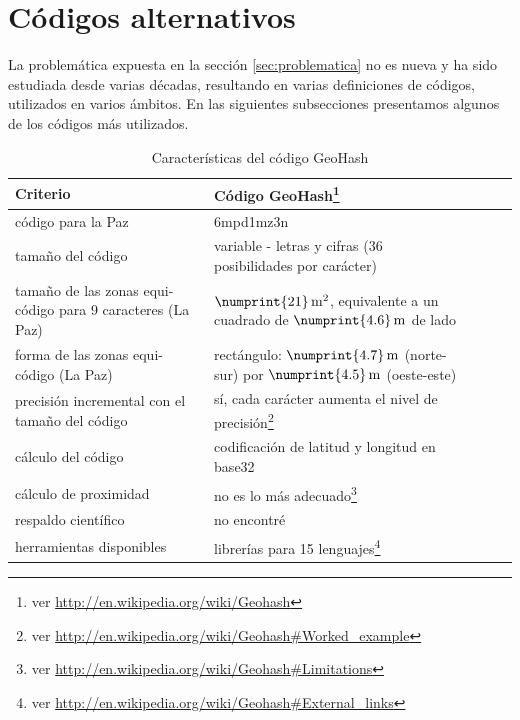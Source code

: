 \documentclass[letterpaper]{article}
\begin{document}
\section{Códigos alternativos}

La problemática expuesta en la sección \ref{sec:problematica} no es 
nueva y ha sido estudiada desde varias décadas, resultando en varias 
definiciones de códigos, utilizados en varios ámbitos. En las 
siguientes subsecciones presentamos algunos de los códigos más 
utilizados.

\begin{table}
	\centering
	\begin{tabular}{|l|l|l|l|l|}
		\hline
		Criterio & Código GeoHash\footnote{ver \url{http://en.wikipedia.org/wiki/Geohash}} \\
		\hline
		código para la Paz & 6mpd1mz3n \\
		tamaño del código & variable - letras y cifras (36 
		posibilidades por carácter) \\
		tamaño de las zonas equi-código para 9 caracteres (La Paz) & 
		\(\numprint{21}\,\mathrm{m^{2}}\), 
		equivalente a un cuadrado de \(\numprint{4.6}\,\mathrm{m}\) de lado \\
		forma de las zonas equi-código (La Paz) & rectángulo: 
		\(\numprint{4.7}\,\mathrm{m}\) (norte-sur) por 
		\(\numprint{4.5}\,\mathrm{m}\) (oeste-este) \\
		precisión incremental con el tamaño del código & sí, cada 
		carácter aumenta el nivel de precisión\footnote{ver 
		\url{http://en.wikipedia.org/wiki/Geohash\#Worked_example}} \\
		cálculo del código & codificación de latitud y longitud en 
		base32 \\
		cálculo de proximidad & no es lo más adecuado\footnote{ver 
		\url{http://en.wikipedia.org/wiki/Geohash\#Limitations}} \\
		respaldo científico & no encontré \\
		herramientas disponibles & librerías para 15 lenguajes\footnote{ver 
		\url{http://en.wikipedia.org/wiki/Geohash\#External_links}} \\
		\hline
	\end{tabular}
	\caption{Características del código GeoHash}
	\label{tab:carac_geohash}
\end{table}
\end{document}
